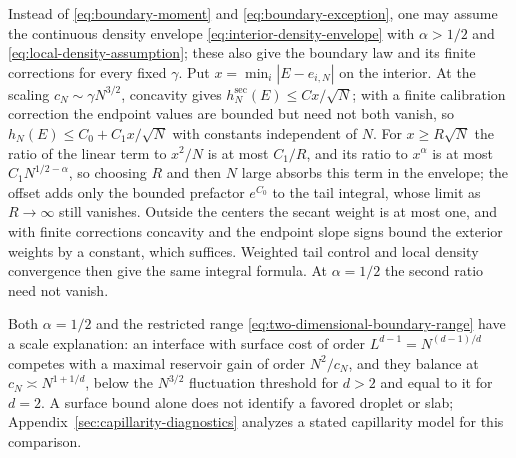 Instead of \eqref{eq:boundary-moment} and
\eqref{eq:boundary-exception}, one may assume the continuous density
envelope \eqref{eq:interior-density-envelope} with $\alpha>1/2$ and
\eqref{eq:local-density-assumption}; these also give the boundary law
and its finite corrections for every fixed $\gamma$. Put
$x=\min_i|E-e_{i,N}|$ on the interior. At the scaling
$c_N\sim\gamma N^{3/2}$, concavity gives
$h_N^{\mathrm{sec}}(E)\le Cx/\sqrt N$; with a finite calibration
correction the endpoint values are bounded but need not both vanish,
so $h_N(E)\le C_0+C_1x/\sqrt N$ with constants independent of $N$.
For $x\ge R\sqrt N$ the ratio of the linear term to $x^2/N$ is at
most $C_1/R$, and its ratio to $x^\alpha$ is at most
$C_1N^{1/2-\alpha}$, so choosing $R$ and then $N$ large absorbs this
term in the envelope; the offset adds only the bounded prefactor
$e^{C_0}$ to the tail integral, whose limit as $R\to\infty$ still
vanishes. Outside the centers the secant weight is at most one, and
with finite corrections concavity and the endpoint slope signs bound
the exterior weights by a constant, which suffices. Weighted tail
control and local density convergence then give the same integral
formula. At $\alpha=1/2$ the second ratio need not vanish.

Both $\alpha=1/2$ and the restricted range
\eqref{eq:two-dimensional-boundary-range} have a scale explanation: an
interface with surface cost of order $L^{d-1}=N^{(d-1)/d}$ competes
with a maximal reservoir gain of order $N^2/c_N$, and they balance at
$c_N\asymp N^{1+1/d}$, below the $N^{3/2}$ fluctuation threshold for
$d>2$ and equal to it for $d=2$. A surface bound alone does not
identify a favored droplet or slab;
Appendix~\ref{sec:capillarity-diagnostics} analyzes a stated
capillarity model for this comparison.
